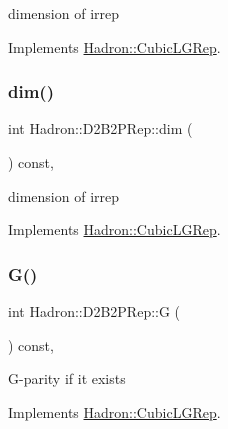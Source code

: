 dimension of irrep 

Implements \mbox{\hyperlink{structHadron_1_1CubicLGRep_a3acbaea26503ed64f20df693a48e4cdd}{Hadron\+::\+Cubic\+L\+G\+Rep}}.

\mbox{\label{structHadron_1_1D2B2PRep_a963b6a6af4da28f02cb06e9ebe7e0273}} 
\subsubsection{\texorpdfstring{dim()}{dim()}\hspace{0.1cm}{\footnotesize\ttfamily [3/3]}}
{\footnotesize\ttfamily int Hadron\+::\+D2\+B2\+P\+Rep\+::dim (\begin{DoxyParamCaption}{ }\end{DoxyParamCaption}) const\hspace{0.3cm}{\ttfamily [inline]}, {\ttfamily [virtual]}}

dimension of irrep 

Implements \mbox{\hyperlink{structHadron_1_1CubicLGRep_a3acbaea26503ed64f20df693a48e4cdd}{Hadron\+::\+Cubic\+L\+G\+Rep}}.

\mbox{\label{structHadron_1_1D2B2PRep_a618a8eb583b83a0dca1bcc219f71e5e7}} 
\subsubsection{\texorpdfstring{G()}{G()}\hspace{0.1cm}{\footnotesize\ttfamily [1/3]}}
{\footnotesize\ttfamily int Hadron\+::\+D2\+B2\+P\+Rep\+::G (\begin{DoxyParamCaption}{ }\end{DoxyParamCaption}) const\hspace{0.3cm}{\ttfamily [inline]}, {\ttfamily [virtual]}}

G-\/parity if it exists 

Implements \mbox{\hyperlink{structHadron_1_1CubicLGRep_ace26f7b2d55e3a668a14cb9026da5231}{Hadron\+::\+Cubic\+L\+G\+Rep}}.

\mbox{\label{structHadron_1_1D2B2PRep_a618a8eb583b83a0dca1bcc219f71e5e7}} 
